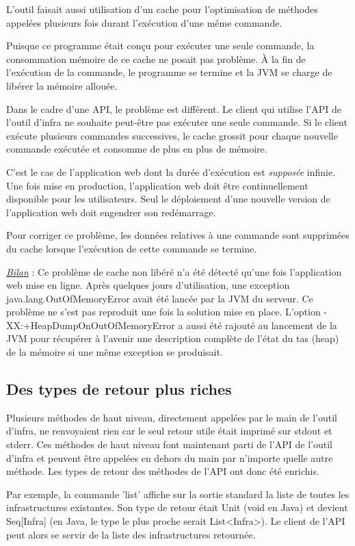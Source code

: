 L'outil faisait aussi utilisation d'un cache pour l'optimisation de méthodes
appelées plusieurs fois durant l'exécution d'une même commande.

Puisque ce programme était conçu pour exécuter une seule commande, la
consommation mémoire de ce cache ne posait pas problème.
À la fin de l'exécution de la commande, le programme se termine et la JVM
se charge de libérer la mémoire allouée.

Dans le cadre d'une API, le problème est différent. Le client qui utilise l'API
de l'outil d'infra ne souhaite peut-être pas exécuter une seule commande.
Si le client exécute plusieurs commandes successives, le cache grossit pour
chaque nouvelle commande exécutée et consomme de plus en plus de mémoire.

C'est le cas de l'application web dont la durée d'exécution est \textit{supposée}
infinie. Une fois mise en production, l'application web doit être
continuellement disponible pour les utilisateurs. Seul le déploiement d'une
nouvelle version de l'application web doit engendrer son redémarrage.

Pour corriger ce problème, les données relatives à une commande sont supprimées
du cache lorsque l'exécution de cette commande se termine.

\underline{\textit{Bilan}} : Ce problème de cache non libéré n'a été détecté
qu'une fois l'application web mise en ligne. Après quelques jours
d'utilisation, une exception java.lang.OutOfMemoryError avait été lancée par la
JVM du serveur. Ce problème ne s'est pas reproduit une fois la solution mise en
place. L'option -XX:+HeapDumpOnOutOfMemoryError a aussi été rajouté au lancement
de la JVM pour récupérer à l'avenir une description complète de l'état du tas
(heap) de la mémoire si une même exception se produisait.

\subsection{Des types de retour plus riches}

Plusieurs méthodes de haut niveau, directement appelées par le main de l'outil
d'infra, ne renvoyaient rien car le seul retour utile était imprimé
sur stdout et stderr. Ces méthodes de haut niveau font maintenant parti de l'API
de l'outil d'infra et peuvent être appelées en dehors du main par n'importe
quelle autre méthode.
Les types de retour des méthodes de l'API ont donc été enrichis.

Par exemple, la commande 'list' affiche sur la sortie standard la liste de
toutes les infrastructures existantes.
Son type de retour était Unit (void en Java) et devient Seq[Infra] (en Java, le
type le plus proche serait List<Infra>).
Le client de l'API peut alors se servir de la liste des infrastructures retournée.


